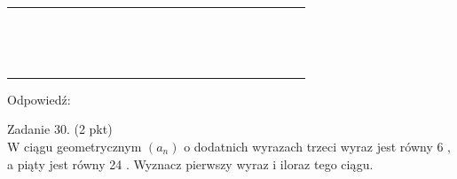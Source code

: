\documentclass[10pt]{article}
\begin{document}
\begin{center}
\begin{tabular}{|c|c|c|c|c|c|c|c|c|c|c|c|c|c|c|c|c|c|c|c|c|c|c|c|}
\hline
 &  &  &  &  &  &  &  &  &  &  &  &  &  &  &  &  &  &  &  &  &  &  &  \\
\hline
 &  &  &  &  &  &  &  &  &  &  &  &  &  &  &  &  &  &  &  &  &  &  &  \\
\hline
 &  &  &  &  &  &  &  &  &  &  &  &  &  &  &  &  &  &  &  &  &  &  &  \\
\hline
 &  &  &  &  &  &  &  &  &  &  &  &  &  &  &  &  &  &  &  &  &  &  &  \\
\hline
 &  &  &  &  &  &  &  &  &  &  &  &  &  &  &  &  &  &  &  &  &  &  &  \\
\hline
 &  &  &  &  &  &  &  &  &  &  &  &  &  &  &  &  &  &  &  &  &  &  &  \\
\hline
 &  &  &  &  &  &  &  &  &  &  &  &  &  &  &  &  &  &  &  &  &  &  &  \\
\hline
 &  &  &  &  &  &  &  &  &  &  &  &  &  &  &  &  &  &  &  &  &  &  &  \\
\hline
 &  &  &  &  &  &  &  &  &  &  &  &  &  &  &  &  &  &  &  &  &  &  &  \\
\hline
 &  &  &  &  &  &  &  &  &  &  &  &  &  &  &  &  &  &  &  &  &  &  &  \\
\hline
 &  &  &  &  &  &  &  &  &  &  &  &  &  &  &  &  &  &  &  &  &  &  &  \\
\hline
 &  &  &  &  &  &  &  &  &  &  &  &  &  &  &  &  &  &  &  &  &  &  &  \\
\hline
 &  &  &  &  &  &  &  &  &  &  &  &  &  &  &  &  &  &  &  &  &  &  &  \\
\hline
 &  &  &  &  &  &  &  &  &  &  &  &  &  &  &  &  &  &  &  &  &  &  &  \\
\hline
 &  &  &  &  &  &  &  &  &  &  &  &  &  &  &  &  &  &  &  &  &  &  &  \\
\hline
 &  &  &  &  &  &  &  &  &  &  &  &  &  &  &  &  &  &  &  &  &  &  &  \\
\hline
\end{tabular}
\end{center}

Odpowiedź: \(\qquad\)

Zadanie 30. (2 pkt)\\
W ciągu geometrycznym \(\left(a_{n}\right)\) o dodatnich wyrazach trzeci wyraz jest równy 6 , a piąty jest równy 24 . Wyznacz pierwszy wyraz i iloraz tego ciągu.
\end{document}
